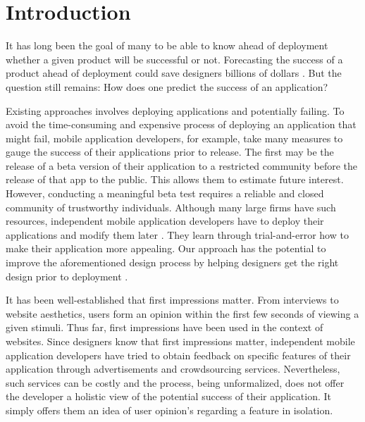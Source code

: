 \section{Introduction}

It has long been the goal of many to be able to know ahead of deployment whether a given product will be successful or not. Forecasting the success of a product ahead of deployment could save designers billions of dollars \cite{tohidi06:getting}. But the question still remains: How does one predict the success of an application?

Existing approaches involves deploying applications and potentially failing. To avoid the time-consuming and expensive process of deploying an application that might fail, mobile application developers, for example, take many measures to gauge the success of their applications prior to release.  The first may be the release of a beta version of their application to a restricted community before the release of that app to the public.  This allows them to estimate future interest. However, conducting a meaningful beta test requires a reliable and closed community of trustworthy individuals. Although many large firms have such resources, independent mobile application developers have to deploy their applications and modify them later \cite{website06:mobile}.  They learn through trial-and-error how to make their application more appealing.  Our approach has the potential to improve the aforementioned design process by helping designers get the right design prior to deployment \cite{tohidi06:getting}.


It has been well-established that first impressions matter. From interviews to website aesthetics, users form an opinion within the first few seconds of viewing a given stimuli. Thus far, first impressions have been used in the context of websites.  Since designers know that first impressions matter, independent mobile application developers have tried to obtain feedback on specific features of their application through advertisements and crowdsourcing services. Nevertheless, such services can be costly and the process, being unformalized, does not offer the developer a holistic view of the potential success of their application.  It simply offers them an idea of user opinion's regarding a feature in isolation.

